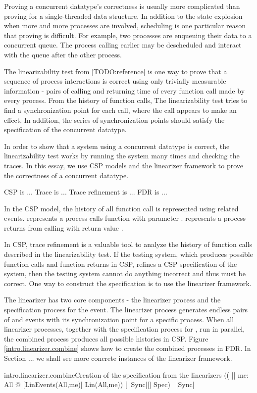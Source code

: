 \documentclass{article}
\begin{document}
Proving a concurrent datatype's correctness is usually more complicated than proving for a single-threaded data structure. In addition to the state explosion when more and more processes are involved, scheduling is one particular reason that proving is difficult. For example, two processes are enqueuing their data to a concurrent queue. The process calling earlier may be descheduled and interact with the queue after the other process.

The linearizability test from [TODO:reference] is one way to prove that a sequence of process interactions is correct using only trivially measurable information - pairs of calling and returning time of every function call made by every process.   From the history of function calls, The linearizability test tries to find a synchronization point for each call, where the call appears to make an effect. In addition, the series of synchronization points should satisfy the specification of the concurrent datatype.

In order to show that a system using a concurrent datatype is correct, the linearizability test works by running the system many times and checking the traces. In this essay, we use CSP models and the linearizer framework to prove the correctness of a concurrent datatype.

CSP is ... Trace is ... Trace refinement is ... FDR is ...

In the CSP model, the history of all function call is represented using related events.  represents a process calls function  with parameter .  represents a process returns from calling  with return value .

In CSP, trace refinement is a valuable tool to analyze the history of function calls described in the linearizability test. If the testing system, which produces possible function calls and function returns in CSP, refines a CSP specification of the system, then the testing system cannot do anything incorrect and thus must be correct. One way to construct the specification is to use the linearizer framework.

The linearizer has two core components - the linearizer process and the specification process for the  event. The linearizer process generates endless pairs of  and  events with its synchronization point for a specific process. When all linearizer processes, together with the specification process for , run in parallel, the combined process produces all possible histories in CSP. Figure \ref{intro.linearizer.combine} shows how to create the combined processes in FDR. In Section ... we shall see more concrete instances of the linearizer framework.
\begin{cspinline}{intro.linearizer.combine}{Creation of the specification from the linearizers}
(( || me: All @ [LinEvents(All,me)]  Lin(All,me)) [|{|Sync|}|] Spec) \ {|Sync|}
\end{cspinline}
\end{document}
